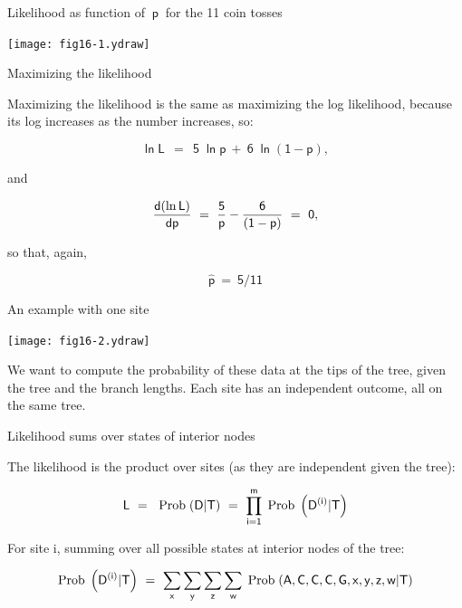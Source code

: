 \documentclass[bluish,slideColor,colorBG,pdf]{prosper}
\def\Prob{{\rm Prob\;}}
\def\prob{{\rm \;Prob\;}}
\begin{document}
\begin{slide}[Replace]{Likelihood  as function of $~\mathsf{p}~$ for the 11 coin tosses}

\centerline{\texttt{[image: fig16-1.ydraw]}}

\end{slide}

\begin{slide}[Replace]{Maximizing the likelihood}
\bigskip

Maximizing the likelihood is the same as maximizing the log likelihood, because
its log increases as the number increases, so:

\[
\mathsf{\ln L\ \ =\ \ 5\; \ln p \ + \ 6\; \ln (1-p)},
\]

and

\[
\mathsf{{d(\ln L)\over dp}\ =\ {5 \over p} - {6 \over (1-p)} \ =\ 0},
\]

so that, again,

\[
\mathsf{\widehat{p}\ =\ 5/11}
\]


\end{slide}

\begin{slide}[Replace]{An example with one site}

\centerline{\texttt{[image: fig16-2.ydraw]}}
\bigskip

We want to compute the probability of these data at the tips of the tree,
given the tree and the branch lengths.   Each site has an independent
outcome, all on the same tree.

\end{slide}

\begin{slide}[Replace]{Likelihood sums over states of interior nodes}

The likelihood is the product over sites (as they are independent given the
tree):

\[
\mathsf{L\ =\ \prob(D|T) \ =\ \prod_{i=1}^m \prob\left(D^{(i)}|T\right)}
\]

For site i, summing over all possible states at interior nodes of the tree:

\[
\mathsf{\Prob\left(D^{(i)}|T\right)\ =\ \sum\limits_x \sum\limits_y \sum\limits_z \sum\limits_w \prob(A, C, C, C, G, x, y, z, w | T)}
\]

\end{slide}
\end{document}
